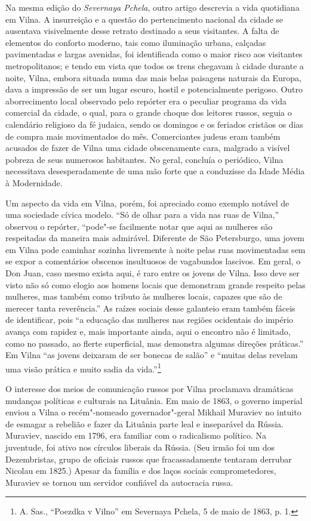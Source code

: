 Na mesma edição do \textit{Severnaya Pchela}, outro artigo descrevia a
vida quotidiana em Vilna. A insurreição e a questão do pertencimento
nacional da cidade se ausentava visivelmente desse retrato destinado a
seus visitantes. A falta de elementos do conforto moderno, tais como
iluminação urbana, calçadas pavimentadas e largas avenidas, foi
identificada como o maior risco aos visitantes metropolitanos; e tendo
em vista que todos os trens chegavam à cidade durante a noite, Vilna,
embora situada numa das mais belas paisagens naturais da Europa, dava a
impressão de ser um lugar escuro, hostil e potencialmente perigoso.
Outro aborrecimento local observado pelo repórter era o peculiar
programa da vida comercial da cidade, o qual, para o grande choque dos
leitores russos, seguia o calendário religioso da fé judaica, sendo os
domingos e os feriados cristãos os dias de compra mais movimentados do
mês. Comerciantes judeus eram também acusados de fazer de Vilna uma
cidade obscenamente cara, malgrado a visível pobreza de seus numerosos
habitantes. No geral, concluía o periódico, Vilna necessitava
desesperadamente de uma mão forte que a conduzisse da Idade Média à
Modernidade.

Um aspecto da vida em Vilna, porém, foi apreciado como exemplo notável
de uma sociedade cívica modelo. ``Só de olhar para a vida nas ruas de
Vilna,'' observou o repórter, ``pode"-se facilmente notar que aqui as
mulheres são respeitadas da maneira mais admirável. Diferente de São
Petersburgo, uma jovem em Vilna pode caminhar sozinha livremente à noite
pelas ruas movimentadas sem se expor a comentários obscenos insultuosos
de vagabundos lascivos. Em geral, o Don Juan, caso mesmo exista aqui, é
raro entre os jovens de Vilna. Isso deve ser visto não só como elogio
aos homens locais que demonstram grande respeito pelas mulheres, mas
também como tributo às mulheres locais, capazes que são de merecer tanta
reverência.'' As raízes sociais desse galanteio eram também fáceis de
identificar, pois ``a educação das mulheres nas regiões ocidentais do
império avança com rapidez e, mais importante ainda, aqui o encontro não
é limitado, como no passado, ao flerte superficial, mas demonstra
algumas direções práticas.'' Em Vilna ``as jovens deixaram de ser
bonecas de salão'' e ``muitas delas revelam uma visão prática e muito
sadia da vida.''\footnote{A. Sas., ``Poezdka v Vilno'' em Severnaya Pchela, 5 de maio de 1863, p. 1.}

O interesse dos meios de comunicação russos por Vilna proclamava
dramáticas mudanças políticas e culturais na Lituânia. Em maio de 1863,
o governo imperial enviou a Vilna o recém"-nomeado governador"-geral
Mikhail Muraviev no intuito de esmagar a rebelião e fazer da Lituânia
parte leal e inseparável da Rússia. Muraviev, nascido em 1796, era
familiar com o radicalismo político. Na juventude, foi ativo nos
círculos liberais da Rússia. (Seu irmão foi um dos Dezembristas, grupo
de oficiais russos que fracassadamente tentaram derrubar Nicolau  em
1825.) Apesar da família e dos laços sociais comprometedores, Muraviev
se tornou um servidor confiável da autocracia russa.

